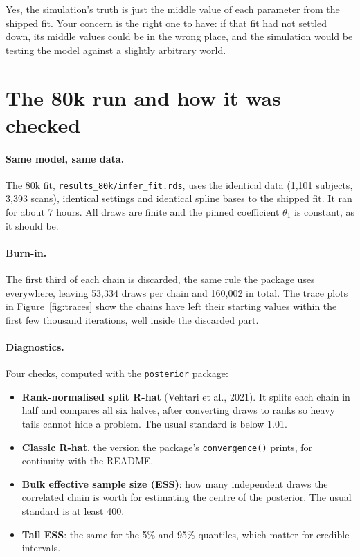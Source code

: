 \documentclass[11pt]{article}
\newcommand{\code}[1]{\texttt{\small #1}}
\begin{document}
\begin{plain}
Yes, the simulation's truth is just the middle value of each parameter from the shipped fit. Your concern is the right one to have: if that fit had not settled down, its middle values could be in the wrong place, and the simulation would be testing the model against a slightly arbitrary world.
\end{plain}

\section{The 80k run and how it was checked}

\paragraph{Same model, same data.} The 80k fit, \code{results\_80k/infer\_fit.rds}, uses the identical data (1,101 subjects, 3,393 scans), identical settings and identical spline bases to the shipped fit. It ran for about 7 hours. All draws are finite and the pinned coefficient $\theta_1$ is constant, as it should be.

\paragraph{Burn-in.} The first third of each chain is discarded, the same rule the package uses everywhere, leaving 53,334 draws per chain and 160,002 in total. The trace plots in Figure~\ref{fig:traces} show the chains have left their starting values within the first few thousand iterations, well inside the discarded part.

\paragraph{Diagnostics.} Four checks, computed with the \code{posterior} package:

\begin{itemize}
  \item \textbf{Rank-normalised split R-hat} (Vehtari et al., 2021). It splits each chain in half and compares all six halves, after converting draws to ranks so heavy tails cannot hide a problem. The usual standard is below 1.01.
  \item \textbf{Classic R-hat}, the version the package's \code{convergence()} prints, for continuity with the README.
  \item \textbf{Bulk effective sample size (ESS)}: how many independent draws the correlated chain is worth for estimating the centre of the posterior. The usual standard is at least 400.
  \item \textbf{Tail ESS}: the same for the 5\% and 95\% quantiles, which matter for credible intervals.
\end{itemize}
\end{document}
